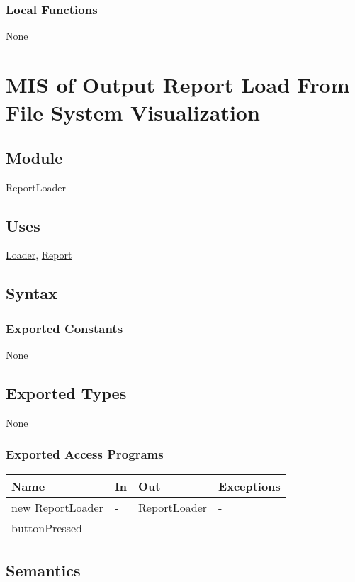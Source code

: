 \documentclass[12pt, titlepage]{article}
\begin{document}
\subsubsection{Local Functions}
None
\newpage
\section{MIS of Output Report Load From File System Visualization} \label{ReportLoader}

\subsection{Module}

ReportLoader

\subsection{Uses}
\hyperref[Loader]{Loader}, \hyperref[Report]{Report}

\subsection{Syntax}

\subsubsection{Exported Constants}
None
\subsection{Exported Types}
None

\subsubsection{Exported Access Programs}
\begin{center}
\begin{tabular}{p{5cm} p{2cm} p{4cm} p{5.5cm}}
\hline
\textbf{Name} & \textbf{In} & \textbf{Out} & \textbf{Exceptions} \\
\hline
new ReportLoader & - & ReportLoader & - \\
\hline
buttonPressed & - & - & - \\
\hline
\end{tabular}
\end{center}

\subsection{Semantics}
\end{document}
